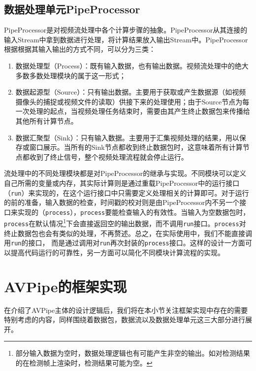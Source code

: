 \subsection{数据处理单元PipeProcessor}\label{ch4:design_proc}
PipeProcessor是对视频流处理中各个计算步骤的抽象。PipeProcessor从其连接的输入Stream中拿到数据进行处理，将计算结果放入输出Stream中。PipeProcessor根据根据其输入输出的方式不同，可以分为三类：
\begin{enumerate}
    \item 数据处理型（Process）：既有输入数据，也有输出数据。视频流处理中的绝大多数多数处理模块的属于这一形式；
    \item 数据起源型（Source）：只有输出数据。主要用于获取或产生数据源（如视频摄像头的捕捉或视频文件的读取）供接下来的处理使用；由于Source节点为每一次处理的起点，当视频处理任务结束时，需要由其产生终止数据包来传播给其他所有计算节点。
    \item 数据汇聚型（Sink）：只有输入数据。主要用于汇集视频处理的结果，用以保存或窗口展示。当所有的Sink节点都收到终止数据包时，这意味着所有计算节点都收到了终止信号，整个视频处理流程就会停止运行。
\end{enumerate}
流处理中的不同处理模块都是对PipeProcessor的继承与实现。不同模块可以定义自己所需的变量或内存，其实际计算则是通过重载PipeProcessor中的运行接口（\texttt{run}）来实现的，在这个运行接口中只需要定义处理相关的计算即可。对于运行的前的准备，输入数据的检查，时间戳的校对则是由PipeProcessor内不另一个接口来实现的（\texttt{process}），\texttt{process}要能检查输入的有效性。当输入为空数据包时，\texttt{process}在默认情况\footnote{部分输入数据为空时，数据处理逻辑也有可能产生非空的输出。如对检测结果的在检测帧上渲染时，检测结果可能为空。}下会直接返回空的输出数据，而不调用\texttt{run}接口。\texttt{process}对终止数据包也会有类似的处理，不再赘述。总之，在实际使用中，我们不能直接调用\texttt{run}的接口，
而是通过调用对\texttt{run}再次封装的\texttt{process}接口。这样的设计一方面可以提高代码运行的可靠性，另一方面可以简化不同模块计算流程的实现。

\section{AVPipe的框架实现}\label{ch4:impl}
在介绍了AVPipe主体的设计逻辑后，我们将在本小节关注框架实现中存在的需要特别考虑的内容，同样围绕着数据包，数据流以及数据处理单元这三大部分进行展开。

